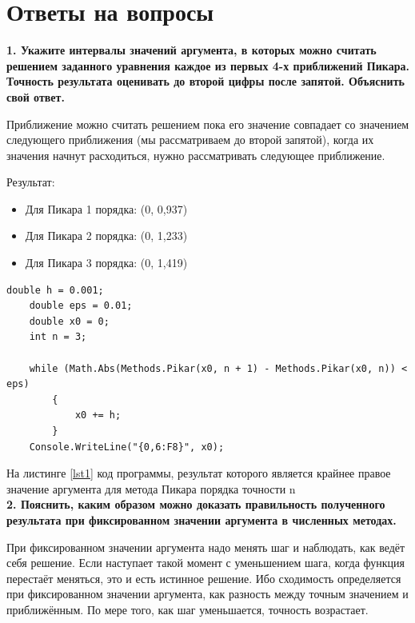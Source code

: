 \chapter{Ответы на вопросы}


\hspace{0cm} \textbf{1. Укажите интервалы значений аргумента, в которых можно считать решением заданного уравнения каждое из первых 4-х приближений Пикара. Точность результата оценивать до второй цифры после запятой. Объяснить свой ответ.}

Приближение можно считать решением пока его значение совпадает со значением следующего приближения (мы рассматриваем до второй запятой), когда их значения начнут расходиться, нужно рассматривать следующее приближение.


Результат:
\begin{itemize}
    \item Для Пикара 1 порядка: (0, 0,937)
    \item Для Пикара 2 порядка: (0, 1,233)
    \item Для Пикара 3 порядка: (0, 1,419)
\end{itemize}

\newpage

\begin{lstlisting}[caption=вычисление крайнего значения аргумента, label=lst1]
    double h = 0.001;  
    double eps = 0.01; 
    double x0 = 0;
    int n = 3;

    while (Math.Abs(Methods.Pikar(x0, n + 1) - Methods.Pikar(x0, n)) < eps)
        {
            x0 += h;
        }
    Console.WriteLine("{0,6:F8}", x0);
\end{lstlisting}

На листинге \ref{lst1} код программы, результат которого является крайнее правое значение аргумента для метода Пикара порядка точности n \\

\hspace{0cm} \textbf{2.  Пояснить, каким образом можно доказать правильность полученного результата при фиксированном значении аргумента в численных методах.}

При фиксированном значении аргумента надо менять шаг и наблюдать, как ведёт себя решение. Если наступает такой момент с уменьшением шага, когда функция перестаёт меняться, это и есть истинное решение. Ибо сходимость определяется при фиксированном значении аргумента, как разность между точным значением и приближённым. По мере того, как шаг уменьшается, точность возрастает. \\

